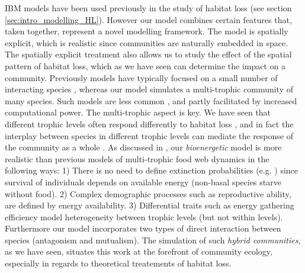 IBM models have been used previously in the study of habitat loss (see section \ref{sec:intro_modelling_HL}). However our model combines certain features that, taken together, represent a novel modelling framework. The model is spatially explicit, which is realistic since communities are naturally embedded in space. The spatially explicit treatment also allows us to study the effect of the spatial pattern of habitat loss, which as we have seen can determine the impact on a community. Previously models have typically focused on a small number of interacting species \cite{klausmeier2001habitat,jager2006simulated,melian2002food}, whereas our model simulates a multi-trophic community of many species. Such models are less common \cite{lurgi2015effects,grimm2013individual}, and partly facilitated by increased computational power. The multi-trophic aspect is key. We have seen that different trophic levels often respond differently to habitat loss \cite{sole2006ecological,duffy2003biodiversity,raffaelli2004extinction}, and in fact the interplay between species in different trophic levels can mediate the response of the community as a whole \cite{sole2006ecological}. As discussed in \cite{lurgi2015effects}, our \emph{bioenergetic} model is more realistic than previous models of multi-trophic food web dynamics \cite{mccann2005dynamics,brose2006allometric,pimm1979complexity} in the following ways: 1) There is no need to define extinction probabilities (e.g. \cite{sole2006ecological,fortuna2013habitat}) since survival of individuals depends on available energy (non-basal species starve without food). 2) Complex demographic processes such as reproductive ability, are defined by energy availability. 3) Differential traits such as energy gathering efficiency model heterogeneity between trophic levels (but not within levels). Furthermore our model incorporates two types of direct interaction between species (antagonism and mutualism). The simulation of such \emph{hybrid communities}, as we have seen, situates this work at the forefront of community ecology, especially in regards to theoretical treatements of habitat loss.        


